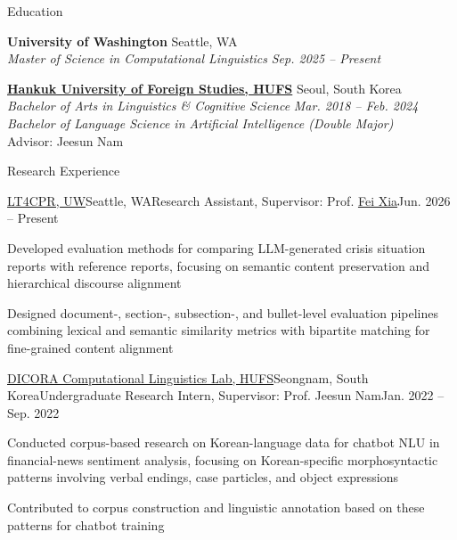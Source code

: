 \documentclass[
	11pt, %
]{resume} %
\begin{document}

\begin{rSection}{Education}

	\textbf{University of Washington} \hfill Seattle, WA \\
	\textsl{Master of Science in Computational Linguistics} \hfill
    \textsl{Sep. 2025 -- Present}

    \textbf{\href{https://www.hufs.ac.kr/hufs/index.do\#section1}{Hankuk University of Foreign Studies, HUFS}} \hfill Seoul, South Korea \\
    \textsl{Bachelor of Arts in Linguistics \& Cognitive Science} \hfill
    \textsl{Mar. 2018 -- Feb. 2024} \\
	\textsl{Bachelor of Language Science in Artificial Intelligence (Double Major)}\\
    Advisor: Jeesun Nam
\end{rSection}


\begin{rSection}{Research Experience}
\begin{rSubsection}{\href{https://lt4cpr.github.io/aacl2026-workshop-LT4CPR/index.html}{LT4CPR, UW}}{Seattle, WA}{Research Assistant, Supervisor: Prof. \href{https://faculty.washington.edu/fxia/}{Fei Xia}}{Jun. 2026 -- Present}
    \item Developed evaluation methods for comparing LLM-generated crisis situation reports with reference reports, focusing on semantic content preservation and hierarchical discourse alignment
    \item Designed document-, section-, subsection-, and bullet-level evaluation pipelines combining lexical and semantic similarity metrics with bipartite matching for fine-grained content alignment
\end{rSubsection}

\begin{rSubsection}{\href{http://dicora.kr/}{DICORA Computational Linguistics Lab, HUFS}}{Seongnam, South Korea}{Undergraduate Research Intern, Supervisor: Prof. Jeesun Nam}{Jan. 2022 -- Sep. 2022}
    \item Conducted corpus-based research on Korean-language data for chatbot NLU in financial-news sentiment analysis, focusing on Korean-specific morphosyntactic patterns involving verbal endings, case particles, and object expressions
    \item Contributed to corpus construction and linguistic annotation based on these patterns for chatbot training
\end{rSubsection}

\end{rSection}
\end{document}
